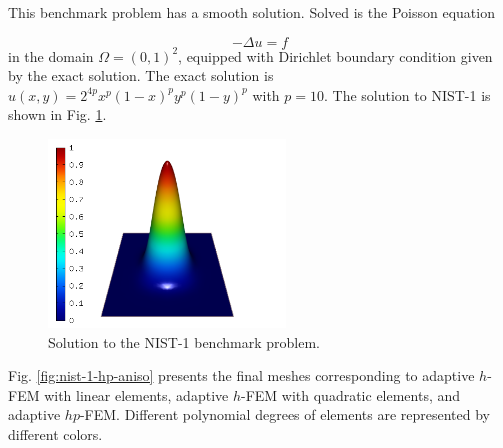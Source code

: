\documentclass[12pt]{elsarticle}
\begin{document}
This benchmark problem has a smooth solution.
Solved is the Poisson equation

\begin{equation} \label{poisson}
-\Delta u = f
\end{equation}
in the domain $\Omega = (0, 1)^2$, equipped with Dirichlet
boundary condition given by the exact solution.
The exact solution is $u(x, y) = 2^{4p}x^{p}(1-x)^{p}y^{p}(1-y)^{p}$
with $p = 10$.
The solution to NIST-1 is shown in Fig. \ref{fig:sln-nist01}.

\begin{figure}[H]
\centering
\vspace{-3mm}
\includegraphics[height=5cm]{nist/nist-1/solution.png}
\vspace{-3mm}
\caption{Solution to the NIST-1 benchmark problem.}
\label{fig:sln-nist01}
\end{figure}

Fig. \ref{fig:nist-1-hp-aniso} presents the final meshes corresponding to adaptive $h$-FEM with
linear elements, adaptive $h$-FEM with quadratic elements, and adaptive $hp$-FEM. Different
polynomial degrees of elements are represented by different colors.
\end{document}
